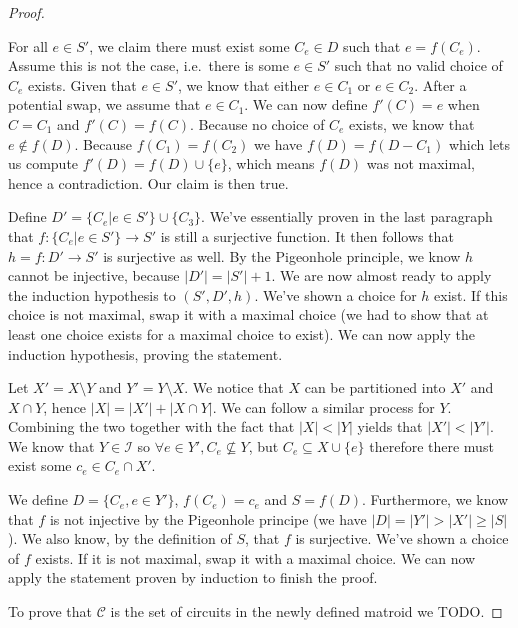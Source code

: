 \begin{proof}
\begin{enumerate}
\begin{enumerate}
            For all $e \in S'$, we claim there must exist some $C_e \in D$ such that $e = f(C_e)$. Assume this is not the case, i.e.\ there is some $e \in S'$ such that no valid choice of $C_e$ exists. Given that $e \in S'$, we know that either $e \in C_1$ or $e \in C_2$. After a potential swap, we assume that $e \in C_1$. We can now define $f'(C) = e$ when $C = C_1$ and $f'(C) = f(C)$. Because no choice of $C_e$ exists, we know that $e \not\in f(D)$. Because $f(C _1 ) = f(C _2 )$ we have $f(D) = f(D - C _1 )$ which lets us compute $f'(D) = f(D) \cup \{e\}$, which means $f(D)$ was not maximal, hence a contradiction. Our claim is then true.

            Define $D' = \{C_e | e \in S'\} \cup \{C _3 \}$. We've essentially proven in the last paragraph that $f : \{C_e | e \in S'\} \to S'$ is still a  surjective function. It then follows that $h = f : D' \to S'$ is surjective as well. By the Pigeonhole principle, we know $h$ cannot be injective, because $|D'| = |S'| + 1$. We are now almost ready to apply the induction hypothesis to $(S', D', h)$. We've shown a choice for $h$ exist. If this choice is not maximal, swap it with a maximal choice (we had to show that at least one choice exists for a maximal choice to exist). We can now apply the induction hypothesis, proving the statement.
    \end{enumerate}

    Let $X' = X \setminus Y$ and $Y' = Y \setminus X$. We notice that $X$ can be partitioned into $X'$ and $X \cap Y$, hence $|X| = |X'| + |X \cap Y|$. We can follow a similar process for $Y$. Combining the two together with the fact that $|X| < |Y|$ yields that $|X'| < |Y'|$. We know that $Y \in \mathcal I$ so $\forall e \in Y', C_e \not \subseteq  Y$, but $C_e \subseteq  X \cup \{e\}$ therefore there must exist some $c_e \in C_e \cap X'$. 

    We define $D = \{C_e, e \in Y'\}$, $f(C_e) = c_e$ and $S = f(D)$. Furthermore, we know that $f$ is not injective by the Pigeonhole principe (we have $|D| = |Y'| > |X'| \geq |S|$). We also know, by the definition of $S$, that $f$ is surjective. We've shown a choice of $f$ exists. If it is not maximal, swap it with a maximal choice. We can now apply the statement proven by induction to finish the proof.
\end{enumerate}

To prove that $\mathcal C $ is the set of circuits in the newly defined matroid we TODO.

\end{proof}



